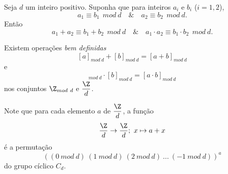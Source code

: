       \begin{stat}
         Seja $d$ um inteiro positivo. Suponha que para inteiros $a_{i}$ e $b_{i}$ ($i = 1,2$), $$a_{1} \equiv b_{1}\ \ mod\ d\quad \&\quad a_{2} \equiv b_{2}\ \ mod\ d.$$ Então $$a_{1} + a_{2} \equiv b_{1} + b_{2}\ \ mod\ d\quad \&\quad a_{1}\cdot a_{2} \equiv b_{1} \cdot b_{2}\ \ mod\ d.$$
      \end{stat}
      \begin{corollary}
         Existem operações \emph{bem definidas}
         \begin{equation}\label{ADITTOP}
            [a]_{mod\ d} + [b]_{mod\ d} = [a+b]_{mod\ d}
         \end{equation}
         e
         \begin{equation}
            [a]_{mod\ d} \cdot [b]_{mod\ d} = [a\cdot b]_{mod\ d}
         \end{equation}
         nos conjuntos $\Z_{mod\ d}$ e $\dfrac{\Z}{d}$.
      \end{corollary}
      Note que para cada elemento $a$ de $\dfrac{\Z}{d}$, a função $$\dfrac{\Z}{d} \to \dfrac{\Z}{d};\ x\mapsto a+x$$
      é a permutação $$\left((0\ mod\ d)\ (1\ mod\ d)\ (2\ mod\ d)\ ...\ (-1\ mod\ d)\right)^{a}$$ do grupo cíclico $C_{d}$.
\newpage



